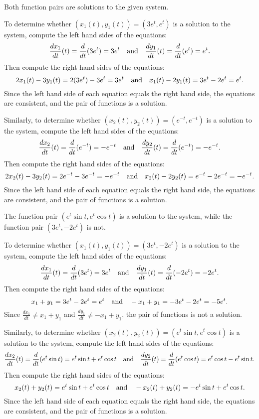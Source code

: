  \ans Both function pairs are solutions to the given system.

\soln To determine whether $(x_1(t),y_1(t)) = (3e^t, e^t)$ is
a solution to the system, compute the left hand sides of the equations:
\[
\frac{dx_1}{dt}(t) = \frac{d}{dt}(3e^t) = 3e^t \quad\mbox{and}\quad
\frac{dy_1}{dt}(t) = \frac{d}{dt}(e^t) = e^t.
\]
Then compute the right hand sides of the equations:
\[
2x_1(t) - 3y_1(t) = 2(3e^t) - 3e^t = 3e^t \quad\mbox{and}\quad
x_1(t) - 2y_1(t) = 3e^t - 2e^t = e^t.
\]
Since the left hand side of each equation equals the right hand side, the
equations are consistent, and the pair of functions is a solution.

\para Similarly, to determine whether $(x_2(t),y_2(t)) = (e^{-t},e^{-t})$
is a solution to the system, compute the left hand sides of the equations:
\[
\frac{dx_2}{dt}(t) = \frac{d}{dt}(e^{-t}) = -e^{-t} \quad\mbox{and}\quad
\frac{dy_2}{dt}(t) = \frac{d}{dt}(e^{-t}) = -e^{-t}.
\]
Then compute the right hand sides of the equations:
\[
2x_2(t) - 3y_2(t) = 2e^{-t} - 3e^{-t} = -e^{-t} \quad\mbox{and}\quad
x_2(t) - 2y_2(t) = e^{-t} - 2e^{-t} = -e^{-t}.
\]
Since the left hand side of each equation equals the right hand side, the
equations are consistent, and the pair of functions is a solution.


 \ans The function pair $(e^t\sin{t},e^t\cos{t})$ is a
solution to the system, while the function pair $(3e^t,-2e^t)$ is not.

\soln To determine whether $(x_1(t),y_1(t)) = (3e^t,-2e^t)$ is
a solution to the system, compute the left hand sides of the equations:
\[
\frac{dx_1}{dt}(t) = \frac{d}{dt}(3e^t) = 3e^t \quad\mbox{and}\quad
\frac{dy_1}{dt}(t) = \frac{d}{dt}(-2e^t) = -2e^t.
\]
Then compute the right hand sides of the equations:
\[
x_1 + y_1 = 3e^t - 2e^t = e^t \quad\mbox{and}\quad
-x_1 + y_1 = -3e^t - 2e^t = -5e^t.
\]
Since $\frac{dx_1}{dt} \neq x_1 + y_1$ and $\frac{dy_1}{dt} \neq -x_1 + y_1$,
the pair of functions is not a solution.

\para Similarly, to determine whether $(x_2(t),y_2(t)) =
(e^t\sin{t},e^t\cos{t})$ is a solution to the system, compute the left
hand sides of the equations:
\[
\frac{dx_2}{dt}(t) = \frac{d}{dt}(e^t\sin{t}) = 
e^t\sin{t} + e^t\cos{t} \quad\mbox{and}\quad
\frac{dy_2}{dt}(t) = \frac{d}{dt}(e^t\cos{t}) =
e^t\cos{t} - e^t\sin{t}.
\]
Then compute the right hand sides of the equations:
\[
x_2(t) + y_2(t) = e^t\sin{t} + e^t\cos{t} \quad\mbox{and}\quad
-x_2(t) + y_2(t) = -e^t\sin{t} + e^t\cos{t}.
\]
Since the left hand side of each equation equals the right hand side, the
equations are consistent, and the pair of functions is a solution.


